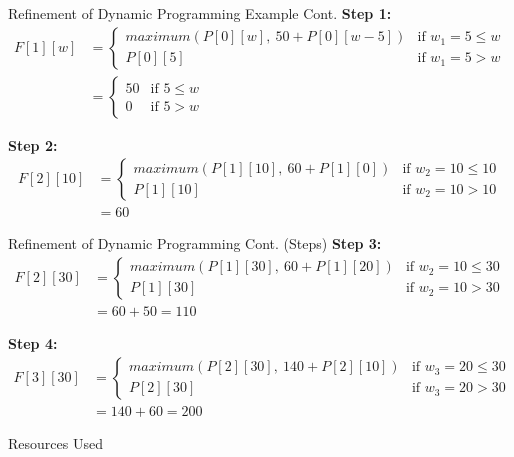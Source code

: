 \documentclass{beamer}
\begin{document}
	\begin{frame}{Refinement of Dynamic Programming Example Cont.}
		\textbf{Step 1: }
		\begin{align*}
			F[1][w] &= 
			\begin{cases}
				maximum(P[0][w], \ 50 + P[0][w-5]) & \mbox{if }  w_1 = 5 \leq w \\
				P[0][5] & \mbox{if } w_1 = 5 > w
			\end{cases} \\
			&= 
			\begin{cases}
				50 & \mbox{if }  5 \leq w \\
				0 & \mbox{if } 5 > w
			\end{cases}
		\end{align*}
		
		\textbf{Step 2: }
		\begin{align*}
			F[2][10] &= 
			\begin{cases}
				maximum(P[1][10], \ 60 + P[1][0]) & \mbox{if }  w_2 = 10 \leq 10 \\
				P[1][10] & \mbox{if } w_2 = 10 > 10
			\end{cases} \\
			&= 60
		\end{align*}
	\end{frame}

	\begin{frame}{Refinement of Dynamic Programming Cont. (Steps)}
				\textbf{Step 3: }
		\begin{align*}
			F[2][30] &= 
			\begin{cases}
				maximum(P[1][30], \ 60 + P[1][20]) & \mbox{if }  w_2 = 10 \leq 30 \\
				P[1][30] & \mbox{if } w_2 = 10 > 30
			\end{cases} \\
			&= 60 + 50 = 110
		\end{align*}
		
		\textbf{Step 4: }
		\begin{align*}
			F[3][30] &= 
			\begin{cases}
				maximum(P[2][30], \ 140 + P[2][10]) & \mbox{if }  w_3 = 20 \leq 30 \\
				P[2][30] & \mbox{if } w_3 = 20 > 30
			\end{cases} \\
			&= 140 + 60 = 200
		\end{align*}
	\end{frame}
	
	\begin{frame}{Resources Used}
		
		 
		\textcolor{white}{\cite{martin_01_2020}\cite{neopolitan_foundations_nodate}\cite{noauthor_knapsack_nodate}\cite{noauthor_knapsack_nodate-2}}
	\end{frame}
\end{document}
